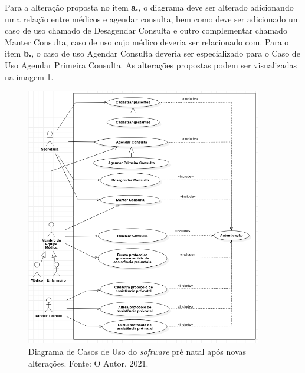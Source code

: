\documentclass[12pt, a4paper]{article}
\newcommand{\tit}[1]{\textit{#1}}
\newcommand{\tb}[1]{\textbf{#1}}
\newcommand{\ssw}{\tit{software} }
\begin{document}
\begin{enumerate}[label=\textbf{\arabic*.}]
{           Para a alteração proposta no item \tb{a.}, o diagrama deve ser alterado adicionando uma relação entre médicos e agendar consulta, bem como deve ser adicionado um caso de uso chamado de Desagendar Consulta e outro complementar chamado Manter Consulta, caso de uso cujo médico deveria ser relacionado com. Para o item \tb{b.}, o caso de uso Agendar Consulta deveria ser especializado para o Caso de Uso Agendar Primeira Consulta. As alterações propostas podem ser visualizadas na imagem \ref{fig:quest32}.
           \begin{figure}[ht!]
               \centering
               \includegraphics[width=0.92\textwidth]{quest3_2.png}
               \caption{Diagrama de Casos de Uso do \ssw pré natal após novas alterações. Fonte: O Autor, 2021.}
               \label{fig:quest32}
           \end{figure}
           
        }
        \newpage
        

\end{enumerate}
\end{document}
